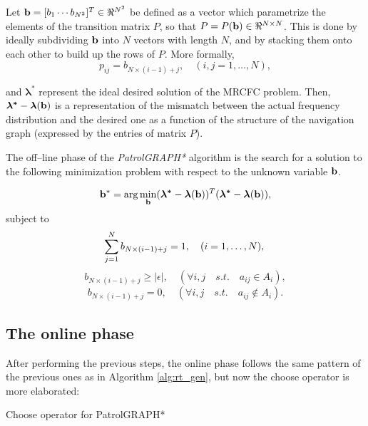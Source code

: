 Let ${\bf{b}} = [b_{1}\cdots b_{N^2}]^T\in \Re^{N^2}$ be defined as a vector which parametrize the elements of the transition matrix $P$, so that $P=P({\bf{b}})\in\Re^{N\times N}$. This is done by ideally subdividing $\bf{b}$ into $N$ vectors with length $N$, and by stacking them onto each other to build up the rows of $P$. More formally, 
\begin{equation}
p_{ij}=b_{N \times (i - 1) + j}, \quad (i,j=1,\ldots,N),
\label{ths0}
\end{equation}

and $\bm{\lambda^*}$ represent the ideal desired solution of the MRCFC problem. Then, ${\bm{\lambda^*} - \bm{\lambda}({\bf{b}})}$ is a representation of the mismatch between the actual frequency distribution and the desired one as a function of the structure of the navigation graph (expressed by the entries of matrix $P$). 

The off--line phase of the \textit{PatrolGRAPH*} algorithm is the search for a solution to the following minimization problem with respect to the unknown variable ${\bf{b}}$.


\begin{equation}
{\bf{b^*}} = \arg \min_{{\bf{b}}}({\bm{\lambda^*} - \bm{\lambda}({\bf{b}})})^T ({\bm{\lambda^*} - \bm{\lambda}({\bf{b}})}),
\label{ths3}
\end{equation}
\indent subject to
\begin{equation}
\sum\limits_{j=1}^{N} {b_{N\times(i-1)+j} } = 1, \quad (i=1,\ldots,N), \\
\label{con3a}
\end{equation}
\begin{equation}
b_{N\times(i-1)+j} \ge  |\epsilon |,\quad (\forall i,j\quad s.t.\quad a_{ij} \in A_i),  
\label{con3b}
\end{equation}
\begin{equation}
b_{N\times(i-1)+j} = 0,\quad (\forall i,j\quad s.t.\quad a_{ij} \notin A_i). 
\label{con3c}
\end{equation}



\subsection{The online phase}
After performing the previous steps, the online phase follows the same pattern of the previous ones as in Algorithm \ref{alg:rt_gen}, but now the choose operator is more elaborated:

\begin{algorithm}
\begin{algorithmic}[1]
 \label{a:PG_upd_cv}
	\label{a:PG_deltaP}
\ENDFOR
{}\label{a:PG_find_min}
\label{a:PG_upd_k}
\end{algorithmic}
\caption{Choose operator for PatrolGRAPH*}\label{alg:rt_pg}
\end{algorithm}

